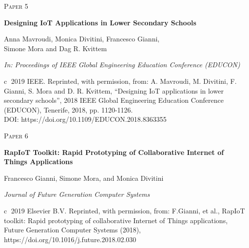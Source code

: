\cleardoublepage
\begin{flushright}
\textsc{\huge Paper 5}
\end{flushright}
\vspace{3cm}
\begin{center}
	\begin{framed}
		{\Large \textbf{Designing IoT Applications in Lower Secondary Schools}}
		
		\medskip
		Anna Mavroudi, Monica Divitini, Francesco Gianni,\\ Simone Mora and Dag R. Kvittem
		
		\medskip
		\emph{In: Proceedings of IEEE Global Engineering Education Conference (EDUCON)}
	\end{framed}	
\end{center}

\vspace{9cm}

{\scriptsize \textcircled{c} 2019 IEEE. Reprinted, with permission, from: A. Mavroudi, M. Divitini, F. Gianni, S. Mora and D. R. Kvittem, \enquote{Designing IoT applications in lower secondary schools}, 2018 IEEE Global Engineering Education Conference (EDUCON), Tenerife, 2018, pp. 1120-1126.}\\
{\tiny DOI: https://doi.org/10.1109/EDUCON.2018.8363355}
\cleardoublepage



\cleardoublepage
\begin{flushright}
\textsc{\huge Paper 6}
\end{flushright}
\vspace{3cm}
\begin{center}
	\begin{framed}
		{\Large \textbf{RapIoT Toolkit: Rapid Prototyping of Collaborative Internet of Things Applications}}	
		\medskip
		
		Francesco Gianni, Simone Mora, and Monica Divitini
		
		\medskip
		\emph{Journal of Future Generation Computer Systems}
	\end{framed}	
\end{center}

\vspace{10cm}

{\scriptsize \textcircled{c} 2019 Elsevier B.V. Reprinted, with permission, from: F.Gianni, et al., RapIoT toolkit: Rapid prototyping of collaborative Internet of Things applications, Future Generation Computer Systems (2018), https://doi.org/10.1016/j.future.2018.02.030}
\cleardoublepage



